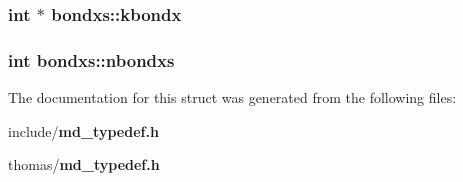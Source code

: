 \subsubsection{\setlength{\rightskip}{0pt plus 5cm}int $\ast$ {\bf bondxs::kbondx}}\label{structbondxs_00156160c93dd2947448d77ddf159869}


\subsubsection{\setlength{\rightskip}{0pt plus 5cm}int {\bf bondxs::nbondxs}}\label{structbondxs_373faaed2eafad519bfafef719635d60}




The documentation for this struct was generated from the following files:\begin{CompactItemize}
\item 
include/{\bf md\_\-typedef.h}\item 
thomas/{\bf md\_\-typedef.h}\end{CompactItemize}
